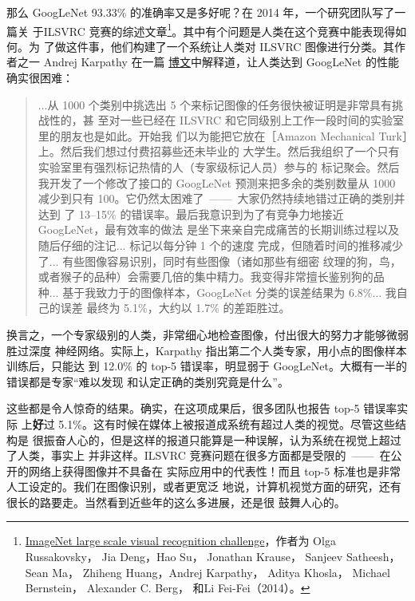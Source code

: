 那么 GoogLeNet 93.33\% 的准确率又是多好呢？在 2014 年，一个研究团队写了一篇关
于ILSVRC 竞赛的综述文章\footnote{\href{http://arxiv.org/abs/1409.0575}{ImageNet
    large scale visual recognition challenge}，作者为 Olga Russakovsky， Jia
  Deng，Hao Su， Jonathan Krause， Sanjeev Satheesh， Sean Ma， Zhiheng
  Huang，Andrej Karpathy， Aditya Khosla， Michael Bernstein， Alexander C.
  Berg， 和Li Fei-Fei（2014）。}。其中有个问题是人类在这个竞赛中能表现得如何。为
了做这件事，他们构建了一个系统让人类对 ILSVRC 图像进行分类。其作者之一 Andrej
Karpathy 在一篇%
\href{http://karpathy.github.io/2014/09/02/what-i-learned-from-competing-against-a-convnet-on-imagenet/}{%
  博文}中解释道，让人类达到 GoogLeNet 的性能确实很困难：

\begin{quote}
  ...从 1000 个类别中挑选出 5 个来标记图像的任务很快被证明是非常具有挑战性的，甚
  至对一些已经在 ILSVRC 和它同级别上工作一段时间的实验室里的朋友也是如此。开始我
  们以为能把它放在［Amazon Mechanical Turk］上。然后我们想过付费招募些还未毕业的
  大学生。然后我组织了一个只有实验室里有强烈标记热情的人（专家级标记人员）参与的
  标记聚会。然后我开发了一个修改了接口的 GoogLeNet 预测来把多余的类别数量从 1000
  减少到只有 100。它仍然太困难了~——~大家仍然持续地错过正确的类别并达到
  了 13--15\% 的错误率。最后我意识到为了有竞争力地接近 GoogLeNet，最有效率的做法
  是坐下来亲自完成痛苦的长期训练过程以及随后仔细的注记... 标记以每分钟 1 个的速度
  完成，但随着时间的推移减少了... 有些图像容易识别，同时有些图像（诸如那些有细密
  纹理的狗，鸟，或者猴子的品种）会需要几倍的集中精力。我变得非常擅长鉴别狗的品
  种... 基于我致力于的图像样本，GoogLeNet 分类的误差结果为 6.8\%... 我自己的误差
  最终为 5.1\%，大约以 1.7\% 的差距胜过。
\end{quote}

换言之，一个专家级别的人类，非常细心地检查图像，付出很大的努力才能够微弱胜过深度
神经网络。实际上，Karpathy 指出第二个人类专家，用小点的图像样本训练后，只能达
到 12.0\% 的 top-5 错误率，明显弱于 GoogLeNet。大概有一半的错误都是专家“难以发现
和认定正确的类别究竟是什么”。

这些都是令人惊奇的结果。确实，在这项成果后，很多团队也报告 top-5 错误率实际
上\textbf{好}过 5.1\%。这有时候在媒体上被报道成系统有超过人类的视觉。尽管这些结构是
很振奋人心的，但是这样的报道只能算是一种误解，认为系统在视觉上超过了人类，事实上
并非这样。ILSVRC 竞赛问题在很多方面都是受限的~——~在公开的网络上获得图像并不具备在
实际应用中的代表性！而且 top-5 标准也是非常人工设定的。我们在图像识别，或者更宽泛
地说，计算机视觉方面的研究，还有很长的路要走。当然看到近些年的这么多进展，还是很
鼓舞人心的。\\

